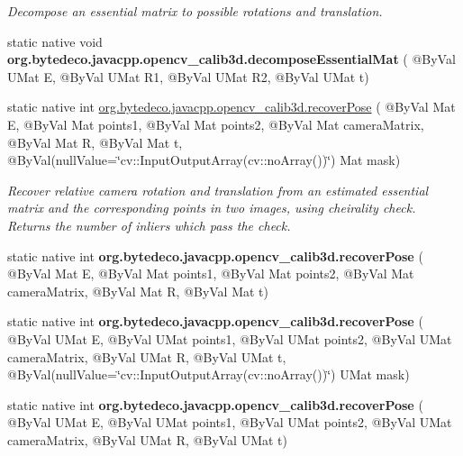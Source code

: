 \begin{DoxyCompactItemize}
\begin{DoxyCompactList}\small\item\em Decompose an essential matrix to possible rotations and translation. \end{DoxyCompactList}\item 
\mbox{\label{group__calib3d_ga5dc6dfa66a16bcc78e72e44b326ab6a3}} 
static native void {\bfseries org.\+bytedeco.\+javacpp.\+opencv\+\_\+calib3d.\+decompose\+Essential\+Mat} ( @By\+Val U\+Mat E, @By\+Val U\+Mat R1, @By\+Val U\+Mat R2, @By\+Val U\+Mat t)
\item 
static native int \hyperlink{group__calib3d_gad7bafb76a3a077aa3ce1e3b98d475311}{org.\+bytedeco.\+javacpp.\+opencv\+\_\+calib3d.\+recover\+Pose} ( @By\+Val Mat E, @By\+Val Mat points1, @By\+Val Mat points2, @By\+Val Mat camera\+Matrix, @By\+Val Mat R, @By\+Val Mat t, @By\+Val(null\+Value=\char`\"{}cv\+::\+Input\+Output\+Array(cv\+::no\+Array())\char`\"{}) Mat mask)
\begin{DoxyCompactList}\small\item\em Recover relative camera rotation and translation from an estimated essential matrix and the corresponding points in two images, using cheirality check. Returns the number of inliers which pass the check. \end{DoxyCompactList}\item 
\mbox{\label{group__calib3d_ga6be6b89cdf5bd14da1432494a5226bbf}} 
static native int {\bfseries org.\+bytedeco.\+javacpp.\+opencv\+\_\+calib3d.\+recover\+Pose} ( @By\+Val Mat E, @By\+Val Mat points1, @By\+Val Mat points2, @By\+Val Mat camera\+Matrix, @By\+Val Mat R, @By\+Val Mat t)
\item 
\mbox{\label{group__calib3d_ga494775a1a8d0308141e8266ea4d77c54}} 
static native int {\bfseries org.\+bytedeco.\+javacpp.\+opencv\+\_\+calib3d.\+recover\+Pose} ( @By\+Val U\+Mat E, @By\+Val U\+Mat points1, @By\+Val U\+Mat points2, @By\+Val U\+Mat camera\+Matrix, @By\+Val U\+Mat R, @By\+Val U\+Mat t, @By\+Val(null\+Value=\char`\"{}cv\+::\+Input\+Output\+Array(cv\+::no\+Array())\char`\"{}) U\+Mat mask)
\item 
\mbox{\label{group__calib3d_gae066033cb1e9f6d944415901cef4acdd}} 
static native int {\bfseries org.\+bytedeco.\+javacpp.\+opencv\+\_\+calib3d.\+recover\+Pose} ( @By\+Val U\+Mat E, @By\+Val U\+Mat points1, @By\+Val U\+Mat points2, @By\+Val U\+Mat camera\+Matrix, @By\+Val U\+Mat R, @By\+Val U\+Mat t)

\end{DoxyCompactItemize}

